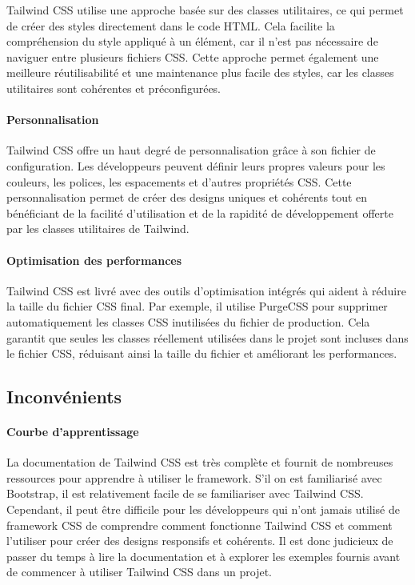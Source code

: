 Tailwind CSS utilise une approche basée sur des classes utilitaires, ce qui permet de créer des styles directement dans le code HTML. Cela facilite la compréhension du style appliqué à un élément, car il n'est pas nécessaire de naviguer entre plusieurs fichiers CSS. Cette approche permet également une meilleure réutilisabilité et une maintenance plus facile des styles, car les classes utilitaires sont cohérentes et préconfigurées.

\paragraph{Personnalisation}

Tailwind CSS offre un haut degré de personnalisation grâce à son fichier de configuration. Les développeurs peuvent définir leurs propres valeurs pour les couleurs, les polices, les espacements et d'autres propriétés CSS. Cette personnalisation permet de créer des designs uniques et cohérents tout en bénéficiant de la facilité d'utilisation et de la rapidité de développement offerte par les classes utilitaires de Tailwind.

\paragraph{Optimisation des performances}

Tailwind CSS est livré avec des outils d'optimisation intégrés qui aident à réduire la taille du fichier CSS final. Par exemple, il utilise PurgeCSS pour supprimer automatiquement les classes CSS inutilisées du fichier de production. Cela garantit que seules les classes réellement utilisées dans le projet sont incluses dans le fichier CSS, réduisant ainsi la taille du fichier et améliorant les performances.

\subsection{Inconvénients}

\paragraph{Courbe d'apprentissage}

La documentation de Tailwind CSS est très complète et fournit de nombreuses ressources pour apprendre à utiliser le framework. S'il on est familiarisé avec Bootstrap, il est relativement facile de se familiariser avec Tailwind CSS. Cependant, il peut être difficile pour les développeurs qui n'ont jamais utilisé de framework CSS de comprendre comment fonctionne Tailwind CSS et comment l'utiliser pour créer des designs responsifs et cohérents. Il est donc judicieux de passer du temps à lire la documentation et à explorer les exemples fournis avant de commencer à utiliser Tailwind CSS dans un projet.

